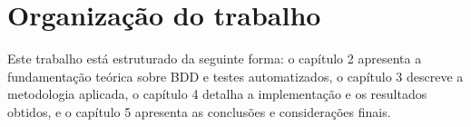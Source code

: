 
\section{Organização do trabalho}
Este trabalho está estruturado da seguinte forma: o capítulo 2 apresenta a fundamentação teórica sobre BDD e testes automatizados, 
o capítulo 3 descreve a metodologia aplicada, o capítulo 4 detalha a implementação e os resultados obtidos, e o capítulo 5 apresenta as conclusões e considerações finais.
